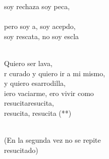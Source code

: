 \begin{cancion}[Resucitados][]
	soy rechaza soy peca, \\
\jump\\
	pero soy a, soy acepdo, \\
	soy rescata, no soy escla \\\jump\\
	\begin{chorus}%
	Quiero  ser lava, \\
	r curado y quiero ir a mi mismo, \\
	y quiero esarrodilla, \\
	iero vaciarme, ero vivir como\\
	resucitaresucita, \\
	resucita, resucita (**) \\
	\end{chorus}%
	\jump\\
(En la segunda vez no se repite\\
resucitado)\\
\end{cancion}%

